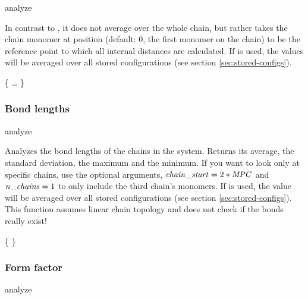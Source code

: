 \begin{essyntax}
  analyze   
\end{essyntax}
In contrast to , it does not average over
the whole chain, but rather takes the chain monomer at position
 (default: $0$, \ie the first monomer on the chain) to be
the reference point to which all internal distances are calculated. If
 is used, the values will be averaged over all stored
configurations (see section \vref{sec:stored-configs}).

\begin{code}
\{   \dots {} \}
\end{code}

\subsubsection{Bond lengths}
\begin{essyntax}
  analyze  
\end{essyntax}

Analyzes the bond lengths of the chains in the system.  Returns its average, the
standard deviation, the maximum and the minimum.  If you want to look
only at specific chains, use the optional arguments, \ie $\mathrm{\mathit{chain\_start}} =
2*\mathrm{\mathit{MPC}}$ and $\mathrm{\mathit{n\_chains}} = 1$ to only include the third
chain's monomers. If  is used, the value will be
averaged over all stored configurations (see section
\vref{sec:stored-configs}).
This function assumes linear chain topology and does not check 
if the bonds really exist!

\begin{code}
\{     \}
\end{code}

\subsubsection{Form factor}
\begin{essyntax}
  analyze  
    \\
\end{essyntax}

